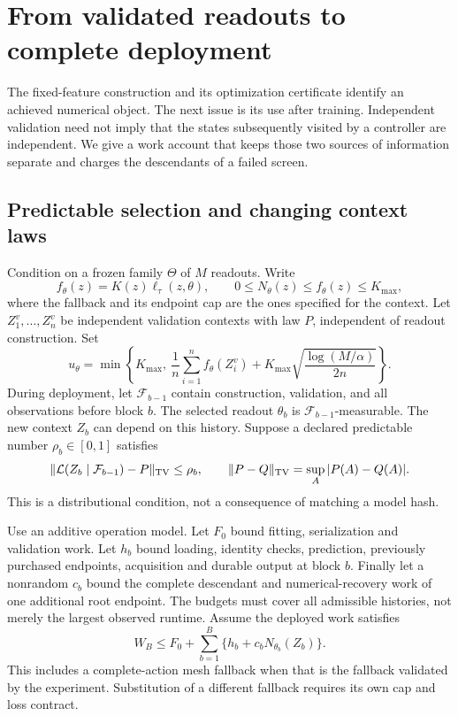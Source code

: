\section{From validated readouts to complete deployment}\label{sec:deployment70}
The fixed-feature construction and its optimization certificate identify an achieved numerical object. The next issue is its use after training. Independent validation need not imply that the states subsequently visited by a controller are independent. We give a work account that keeps those two sources of information separate and charges the descendants of a failed screen.

\subsection{Predictable selection and changing context laws}
Condition on a frozen family $\Theta$ of $M$ readouts. Write
\[
 f_\theta(z)=K(z)\ell_\tau(z,\theta),\qquad
 0\le N_\theta(z)\le f_\theta(z)\le K_{\max},
\]
where the fallback and its endpoint cap are the ones specified for the context. Let $Z_1^v,\ldots,Z_n^v$ be independent validation contexts with law $P$, independent of readout construction. Set
\begin{equation}\label{eq:validated-upper70}
 u_\theta=\min\left\{K_{\max},\ \frac1n\sum_{i=1}^nf_\theta(Z_i^v)
       +K_{\max}\sqrt{\frac{\log(M/\alpha)}{2n}}\right\}.
\end{equation}
During deployment, let $\mathcal F_{b-1}$ contain construction, validation, and all observations before block $b$. The selected readout $\theta_b$ is $\mathcal F_{b-1}$-measurable. The new context $Z_b$ can depend on this history. Suppose a declared predictable number $\rho_b\in[0,1]$ satisfies
\begin{equation}\label{eq:context-transfer70}
 \|\mathcal L(Z_b\mid\mathcal F_{b-1})-P\|_{\rm TV}\le\rho_b,
 \qquad \|P-Q\|_{\rm TV}=\sup_A|P(A)-Q(A)|.
\end{equation}
This is a distributional condition, not a consequence of matching a model hash.

Use an additive operation model. Let $F_0$ bound fitting, serialization and validation work. Let $h_b$ bound loading, identity checks, prediction, previously purchased endpoints, acquisition and durable output at block $b$. Finally let a nonrandom $c_b$ bound the complete descendant and numerical-recovery work of one additional root endpoint. The budgets must cover all admissible histories, not merely the largest observed runtime. Assume the deployed work satisfies
\[
 W_B\le F_0+\sum_{b=1}^B\{h_b+c_bN_{\theta_b}(Z_b)\}.
\]
This includes a complete-action mesh fallback when that is the fallback validated by the experiment. Substitution of a different fallback requires its own cap and loss contract.


